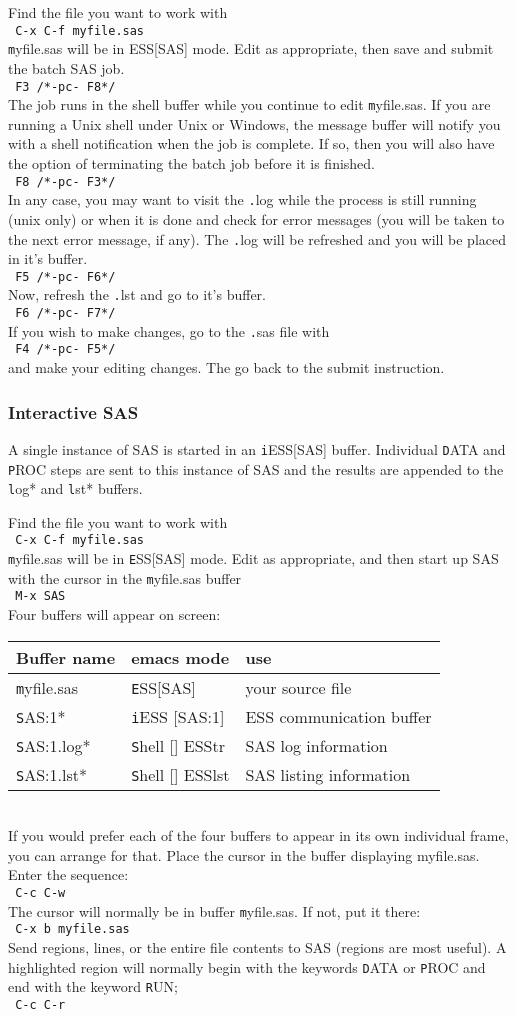 \documentclass{article}
\newcommand{\elcode}[1]{\\{\texttt{\hspace*{2em} #1}}\\}
\begin{document}
Find the file you want to work with
    \elcode{C-x C-f myfile.sas}
{\texttt myfile.sas} will be in ESS[SAS] mode.
Edit as appropriate, then save and submit the batch SAS job.
    \elcode{F3  /*-pc- F8*/}
The job runs in the shell buffer while you continue to edit 
{\texttt myfile.sas}.  If you are running a Unix shell under Unix or
Windows, the message buffer will notify you with a shell
notification when the job is complete.  If so, then you 
will also have the option of terminating the batch job
before it is finished.
    \elcode{F8  /*-pc- F3*/}
In any case, you may want to visit the {\texttt .log} while the process
is still running (unix only) or when it is done and check for
error messages 
(you will be taken to the next error message, if any).
The {\texttt .log} will be refreshed and you will be placed in it's buffer.
    \elcode{F5  /*-pc- F6*/}
Now, refresh the {\texttt .lst} and go to it's buffer.
    \elcode{F6  /*-pc- F7*/}
If you wish to make changes, go to the {\texttt .sas} file with
    \elcode{F4 /*-pc- F5*/}
and make your editing changes.  The go back to the submit instruction.

\subsubsection{Interactive SAS}
A single instance of SAS is started in an {\texttt iESS[SAS]} buffer.  Individual
{\texttt DATA} and {\texttt PROC} steps are sent to this instance of SAS and the results
are appended to the {\texttt *log*} and {\texttt *lst*} buffers.

 Find the file you want to work with
    \elcode{C-x C-f myfile.sas}
 {\texttt myfile.sas} will be in {\texttt ESS[SAS]} mode.
Edit as appropriate, and then start up SAS with the cursor in
the {\texttt myfile.sas} buffer
    \elcode{M-x SAS}
Four buffers will appear on screen:\\
\begin{tabular}{lll}
\hline
Buffer name     & emacs mode         & use\\
\hline
\texttt myfile.sas  & \texttt ESS[SAS]       &your source file         \\
\texttt *SAS:1*     & \texttt iESS [SAS:1]   &ESS communication buffer \\
\texttt *SAS:1.log* & \texttt Shell [] ESStr &SAS log information      \\
\texttt *SAS:1.lst* & \texttt Shell [] ESSlst&SAS listing information  \\
\hline
\end{tabular}\\[1ex]
 If you would prefer each of the four buffers to appear in its
 own individual frame, you can arrange for that.  Place the
 cursor in the buffer displaying myfile.sas.  Enter the
 sequence:
    \elcode{C-c C-w}
The cursor will normally be in buffer {\texttt myfile.sas}.
If not, put it there:
    \elcode{C-x b myfile.sas}
Send regions, lines, or the entire file contents to SAS
(regions are most useful).  A highlighted region will normally
begin with the keywords {\texttt DATA} or {\texttt PROC} and end with the
keyword {\texttt RUN;}
    \elcode{C-c C-r}
\end{document}
